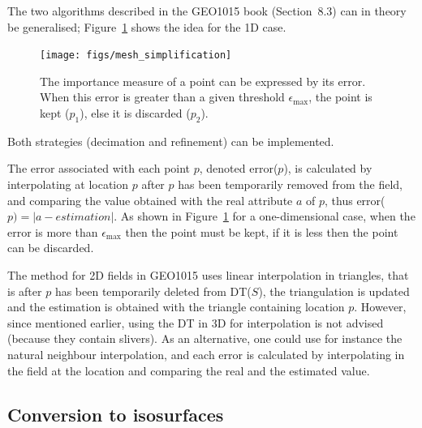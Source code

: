 %

The two algorithms described in the GEO1015 book (Section~8.3) can in theory be generalised; Figure~\ref{fig:meshsimplification} shows the idea for the 1D case.
\begin{figure}
  \centering
  \texttt{[image: figs/mesh\_simplification]}
  \caption[The importance measure of a point expressed by its error]{The importance measure of a point can be expressed by its error. When this error is greater than a given threshold $\epsilon_{\max}$, the point is kept ($p_1$), else it is discarded ($p_2$).}%
\label{fig:meshsimplification}
\end{figure}
Both strategies (decimation and refinement) can be implemented.

The error associated with each point $p$, denoted error($p$), is calculated by interpolating at location $p$ after $p$ has been temporarily removed from the field, and comparing the value obtained with the real attribute $a$ of $p$, thus error($p) = |a - estimation|$. 
As shown in Figure~\ref{fig:meshsimplification} for a one-dimensional case, when the error is more than $\epsilon_{\max}$ then the point must be kept, if it is less then the point can be discarded.

The method for 2D fields in GEO1015 uses linear interpolation in triangles, that is after $p$ has been temporarily deleted from DT($S$), the triangulation is updated and the estimation is obtained with the triangle containing location $p$. 
However, since mentioned earlier, using the DT in 3D for interpolation is not advised (because they contain slivers).
As an alternative, one could use for instance the natural neighbour interpolation, and each error is calculated by interpolating in the field at the location and comparing the real and the estimated value.


\subsection{Conversion to isosurfaces}

